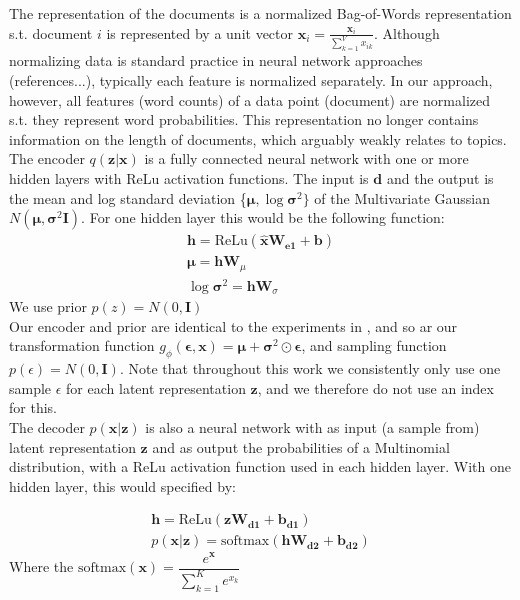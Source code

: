 \documentclass{report}
\begin{document}
The representation of the documents is a normalized Bag-of-Words representation s.t. document $i$ is represented by a unit vector $\hat{\mathbf{x}_i} = \frac{\mathbf{x}_i}{\sum_{k=1}^{V}x_{ik}}$. Although normalizing data is standard practice in neural network approaches (references...), typically each feature is normalized separately. In our approach, however, all features (word counts) of a data point (document) are normalized s.t. they represent word probabilities. This representation no longer contains information on the length of documents, which arguably weakly relates to topics.
\\
The encoder $q(\mathbf{z}|\mathbf{x})$ is a fully connected neural network with one or more hidden layers with ReLu activation functions. The input is $\mathbf{d}$ and the output is the mean and log standard deviation \{$\boldsymbol{\mu}, \log \boldsymbol{\sigma} ^2\}$ of the Multivariate Gaussian $N(\boldsymbol{\mu}, \boldsymbol{\sigma} ^2\textbf{I})$. For one hidden layer this would be the following function:
\begin{align}
\mathbf{h} = \text{ReLu}(\mathbf{\hat{x}}\mathbf{W_{e1}} + \mathbf{b}) \\
\boldsymbol{\mu} = \mathbf{hW}_{\mu} \\
\log \boldsymbol{\sigma}^2 = \mathbf{hW}_{\sigma}
\end{align} 
We use prior $p(z) = N(0,\textbf{I})$
\\
Our encoder and prior are identical to the experiments in \cite{kingma2013auto}, and so ar our transformation function $g_\phi(\boldsymbol{\epsilon},\mathbf{x}) = \boldsymbol{\mu} + \boldsymbol{\sigma}^2\odot \boldsymbol{\epsilon}$, and sampling function $p(\epsilon) = N(0,\textbf{I})$. Note that throughout this work we consistently only use one sample $\epsilon$ for each latent representation $\mathbf{z}$, and we therefore do not use an index for this.\\
The decoder $p(\mathbf{x}|\mathbf{z})$ is also a neural network with as input (a sample from) latent representation $\mathbf{z}$ and as output the probabilities of a Multinomial distribution, with a ReLu activation function used in each hidden layer. With one hidden layer, this would specified by:

\begin{align}
\mathbf{h} = \text{ReLu}(\mathbf{zW_{d1}+b_{d1}})
\\
p(\mathbf{x}|\mathbf{z}) = \text{softmax} (\mathbf{hW_{d2}}+\mathbf{b_{d2}})
\end{align}
Where the $\text{softmax}(\mathbf{x}) = \dfrac{e^{\mathbf{x}}}{\sum_{k=1}^{K}e^{x_k}}$
\end{document}
